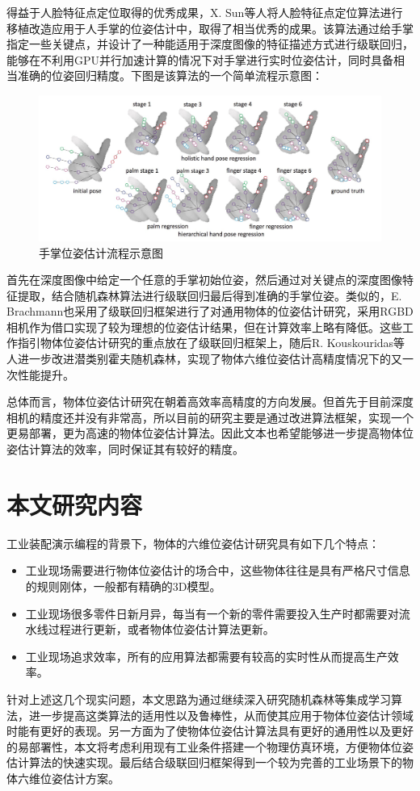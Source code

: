得益于人脸特征点定位取得的优秀成果，X. Sun等人将人脸特征点定位算法进行移植改造应用于人手掌的位姿估计中，取得了相当优秀的成果\cite{sun2015cascaded}。该算法通过给手掌指定一些关键点，并设计了一种能适用于深度图像的特征描述方式进行级联回归，能够在不利用GPU并行加速计算的情况下对手掌进行实时位姿估计，同时具备相当准确的位姿回归精度。下图是该算法的一个简单流程示意图：
\begin{figure}[htb]
	\centering 
	\includegraphics[width=\textwidth]{./mypic/手掌位姿估计流程示意图.jpg} 
	\caption{手掌位姿估计流程示意图} 
\end{figure}
首先在深度图像中给定一个任意的手掌初始位姿，然后通过对关键点的深度图像特征提取，结合随机森林算法进行级联回归最后得到准确的手掌位姿。类似的，E. Brachmann也采用了级联回归框架进行了对通用物体的位姿估计研究，采用RGBD相机作为借口实现了较为理想的位姿估计结果，但在计算效率上略有降低\cite{brachmann2016uncertainty}。这些工作指引物体位姿估计研究的重点放在了级联回归框架上，随后R. Kouskouridas等人进一步改进潜类别霍夫随机森林，实现了物体六维位姿估计高精度情况下的又一次性能提升\cite{kouskouridas2016latent}。

总体而言，物体位姿估计研究在朝着高效率高精度的方向发展。但首先于目前深度相机的精度还并没有非常高，所以目前的研究主要是通过改进算法框架，实现一个更易部署，更为高速的物体位姿估计算法。因此文本也希望能够进一步提高物体位姿估计算法的效率，同时保证其有较好的精度。

\section{本文研究内容}

工业装配演示编程的背景下，物体的六维位姿估计研究具有如下几个特点：
\begin{itemize}
\item 工业现场需要进行物体位姿估计的场合中，这些物体往往是具有严格尺寸信息的规则刚体，一般都有精确的3D模型。
\item 工业现场很多零件日新月异，每当有一个新的零件需要投入生产时都需要对流水线过程进行更新，或者物体位姿估计算法更新。
\item 工业现场追求效率，所有的应用算法都需要有较高的实时性从而提高生产效率。
\end{itemize}
针对上述这几个现实问题，本文思路为通过继续深入研究随机森林等集成学习算法，进一步提高这类算法的适用性以及鲁棒性，从而使其应用于物体位姿估计领域时能有更好的表现。另一方面为了使物体位姿估计算法具有更好的通用性以及更好的易部署性，本文将考虑利用现有工业条件搭建一个物理仿真环境，方便物体位姿估计算法的快速实现。最后结合级联回归框架得到一个较为完善的工业场景下的物体六维位姿估计方案。

